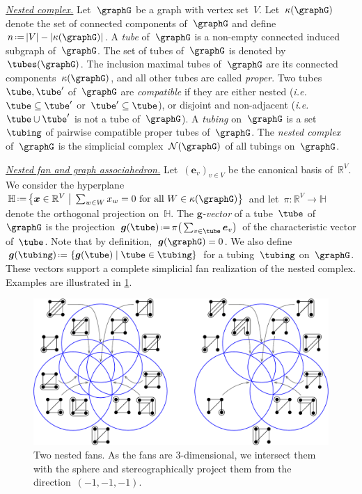 \documentclass{amsart}
\theoremstyle{definition}
\newcommand{\R}{\mathbb{R}} %
\newcommand{\HH}{\mathbb{H}} %
\renewcommand{\b}[1]{{\boldsymbol{#1}}} %
\newcommand{\set}[2]{\left\{ #1 \;\middle|\; #2 \right\}} %
\newcommand{\bigset}[2]{\big\{ #1 \;\big|\; #2 \big\}} %
\newcommand{\eqdef}{\mbox{\,\raisebox{0.2ex}{\scriptsize\ensuremath{\mathrm:}}\ensuremath{=}\,}} %
\newcommand{\ie}{\textit{i.e.}~} %
\newcommand{\darkblue}{\color{darkblue}} %
\newcommand{\defn}[1]{\textsl{\darkblue #1}} %
\newcommand{\para}[1]{\medskip\noindent\uline{\textit{#1.}}} %
\newcommand{\gvector}[1]{\b{g}(#1)} %
\newcommand{\gvectors}[1]{\b{g}(#1)} %
\newcommand{\ground}{V} %
\newcommand{\connectedComponents}{\kappa} %
\newcommand{\nestedComplex}{\mathcal{N}} %
\begin{document}
\para{Nested complex}
%
Let~$\graphG$ be a graph with vertex set~$\ground$.
Let~$\connectedComponents(\graphG)$ denote the set of connected components of~$\graphG$ and define~$n \eqdef |\ground|-|\connectedComponents(\graphG)|$.
A \defn{tube} of~$\graphG$ is a non-empty connected induced subgraph of~$\graphG$.
The set of tubes of~$\graphG$ is denoted by~$\tubes(\graphG)$.
The inclusion maximal tubes of~$\graphG$ are its connected components~$\connectedComponents(\graphG)$, and all other tubes are called \defn{proper}.
Two tubes~$\tube, \tube'$ of~$\graphG$ are \defn{compatible} if they are either nested (\ie $\tube \subseteq \tube'$ or~$\tube' \subseteq \tube$), or disjoint and non-adjacent (\ie $\tube \cup \tube'$ is not a tube of~$\graphG$).
A \defn{tubing} on~$\graphG$ is a set~$\tubing$ of pairwise compatible proper tubes of~$\graphG$.
The \defn{nested complex} of~$\graphG$ is the simplicial complex~$\nestedComplex(\graphG)$ of all tubings on~$\graphG$.

\para{Nested fan and graph associahedron}
%
Let~$(\b{e}_v)_{v \in \ground}$ be the canonical basis of~$\R^\ground$.
We consider the hyperplane~${\HH \eqdef \bigset{\b{x} \in \R^\ground}{\sum_{w \in W} x_w = 0 \text{ for all } W \in \connectedComponents(\graphG)}}$ and let~$\pi : \R^\ground \to \HH$ denote the orthogonal projection on~$\HH$.
The \defn{$\b{g}$-vector} of a tube~$\tube$ of~$\graphG$ is the projection~$\gvector{\tube} \eqdef \pi \big( \sum_{v \in \tube} \b{e}_v \big)$ of the characteristic vector of~$\tube$.
Note that by definition,~$\gvector{\graphG} = 0$.
We also define~$\gvectors{\tubing} \eqdef \set{\gvector{\tube}}{\tube \in \tubing}$ for a tubing~$\tubing$ on~$\graphG$.
These vectors support a complete simplicial fan realization of the nested complex.
Examples are illustrated in \cref{fig:nestedFans}.

\begin{figure}[h]
	\capstart
	\centerline{\includegraphics[scale=.55]{nestedFans}}
	\caption{Two nested fans. As the fans are $3$-dimensional, we intersect them with the sphere and stereographically project them from the direction~$(-1,-1,-1)$.}
	\label{fig:nestedFans}
\end{figure}
\end{document}
